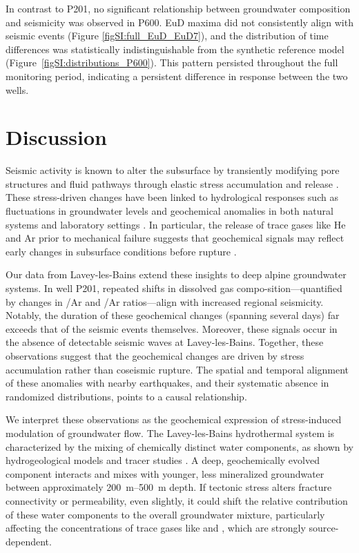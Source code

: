 In contrast to P201, no significant relationship between groundwater composition and seismicity was observed in P600.
EuD maxima did not consistently align with seismic events (Figure \ref{figSI:full_EuD_EuD7}), and the distribution of time differences was statistically indistinguishable from the synthetic reference model (Figure~\ref{figSI:distributions_P600}).
This pattern persisted throughout the full monitoring period, indicating a persistent difference in response between the two wells.

\section{Discussion}
Seismic activity is known to alter the subsurface by transiently modifying pore structures and fluid pathways through elastic stress accumulation and release \citep{nakagomi2021stress, liu2024opposite}.
These stress-driven changes have been linked to hydrological responses such as fluctuations in groundwater levels and geochemical anomalies in both natural systems and laboratory settings \citep{rutter2016aquifer, bauer2016release}.
In particular, the release of trace gases like He and Ar prior to mechanical failure suggests that geochemical signals may reflect early changes in subsurface conditions before rupture \citep{roques2020helium}.

Our data from Lavey-les-Bains extend these insights to deep alpine groundwater systems.
In well P201, repeated shifts in dissolved gas compo-sition---quantified by changes in /Ar and /Ar ratios---align with increased regional seismicity.
Notably, the duration of these geochemical changes (spanning several days) far exceeds that of the seismic events themselves.
Moreover, these signals occur in the absence of detectable seismic waves at Lavey-les-Bains.
Together, these observations suggest that the geochemical changes are driven by stress accumulation rather than coseismic rupture.
The spatial and temporal alignment of these anomalies with nearby earthquakes, and their systematic absence in randomized distributions, points to a causal relationship.

We interpret these observations as the geochemical expression of stress-induced modulation of groundwater flow.
The Lavey-les-Bains hydrothermal system is characterized by the mixing of chemically distinct water components, as shown by hydrogeological models and tracer studies \citep{sonney2009numerical, giroud2025microbio}.
A deep, geochemically evolved component interacts and mixes with younger, less mineralized groundwater between approximately \SIrange{200}{500}{\metre} depth.
If tectonic stress alters fracture connectivity or permeability, even slightly, it could shift the relative contribution of these water components to the overall groundwater mixture, particularly affecting the concentrations of trace gases like  and , which are strongly source-dependent.

